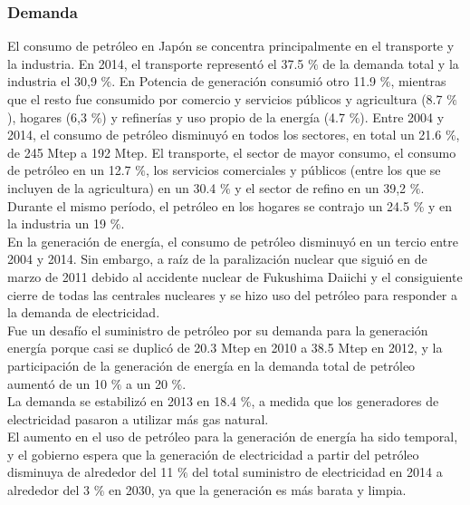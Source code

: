 \documentclass[]{article}
\begin{document}
\subsubsection{Demanda}

El consumo de petróleo en Japón se concentra principalmente en el transporte y la industria. En 2014, el transporte
representó el 37.5 $\%$ de la demanda total y la industria el 30,9 $\%$.
En Potencia de generación consumió otro 11.9 $\%$, mientras que el resto fue consumido por
comercio y servicios públicos y agricultura (8.7 $\%$), hogares (6,3 $\%$) y refinerías
y uso propio de la energía (4.7 $\%$). Entre 2004 y 2014, el consumo de petróleo disminuyó en todos los sectores,
en total un 21.6 $\%$, de 245 Mtep a 192 Mtep. El transporte, el sector de mayor consumo,
el consumo de petróleo en un 12.7 $\%$, los servicios comerciales y públicos (entre los que se incluyen
de la agricultura) en un 30.4 $\%$ y el sector de refino en un 39,2 $\%$. Durante el mismo período, el petróleo
en los hogares se contrajo un 24.5 $\%$ y en la industria un 19 $\%$.\\

En la generación de energía, el consumo de petróleo disminuyó en un tercio entre 2004 y 2014. Sin embargo, a raíz de la paralización nuclear que siguió en de marzo de 2011 debido al accidente nuclear de Fukushima Daiichi y el consiguiente cierre de todas las centrales nucleares y se hizo uso del petróleo para responder a la demanda de electricidad.\\

Fue un desafío el suministro de petróleo por su demanda para la generación energía porque casi se duplicó de 20.3 Mtep en 2010 a 38.5 
Mtep en 2012, y la participación de la generación de energía en la demanda total de petróleo aumentó de un 10 $\%$ a un 20 $\%$.\\

La demanda se estabilizó en 2013 en 18.4 $\%$, a medida que los generadores de electricidad pasaron a utilizar más gas natural.\\

 El aumento en el uso de petróleo para la generación de energía ha sido temporal, y el gobierno espera que la generación de electricidad a partir del petróleo disminuya de alrededor del 11 $\%$ del total
suministro de electricidad en 2014 a alrededor del 3 $\%$ en 2030, ya que la generación es más barata y limpia.\\

\end{document}
